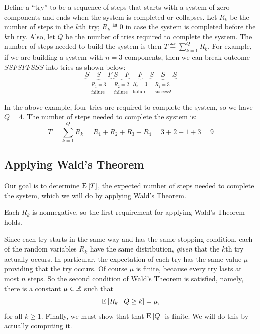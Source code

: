 \documentclass[11pt,twoside]{article}
\begin{document}
Define a ``try'' to be a sequence of steps that starts with a system
of zero components and ends when the system is completed or collapses.
Let $R_k$ be the number of steps in the $k$th try; $R_k \eqdef 0$ in case
the system is completed before the $k$th try.  Also, let $Q$ be the
number of tries required to complete the system.  The number of steps
needed to build the system is then $T \eqdef \sum_{k=1}^Q R_k$.  For
example, if we are building a system with $n = 3$ components, then we
can break outcome $SSFSFFSSS$ into tries as shown below:
\[
\underbrace{S \quad S \quad F}_{
        \begin{array}{c} R_1 = 3 \\ \text{failure} \end{array}}
\underbrace{S \quad F}_{
        \begin{array}{c} R_2 = 2 \\ \text{failure} \end{array}}
\underbrace{F}_{
        \begin{array}{c} R_3 = 1 \\ \text{failure} \end{array}}
\underbrace{S \quad S \quad S}_{
        \begin{array}{c} R_4 = 3 \\ \text{success!} \end{array}}
\]

In the above example, four tries are required to complete the system,
so we have $Q = 4$.  The number of steps needed to complete the system
is:
\[
T = \sum_{k=1}^Q R_k = R_1 + R_2 + R_3 + R_4 = 3 + 2 + 1 + 3 = 9
\]

\subsection{Applying Wald's Theorem}

Our goal is to determine $\mathop{\textup{E}}\nolimits\left[T\right]$, the expected number of steps needed
to complete the system, which we will do by applying Wald's Theorem.

Each $R_k$ is nonnegative, so the first requirement for applying Wald's
Theorem holds.

Since each try starts in the same way and has the same stopping condition,
each of the random variables $R_k$ have the same distribution,
\emph{given} that the $k$th try actually occurs.  In particular, the
expectation of each try has the same value $\mu$ providing that the try
occurs.  Of course $\mu$ is finite, because every try lasts at most $n$
steps.  So the second condition of Wald's Theorem is satisfied, namely,
there is a constant $\mu \in \mathbb{R}$ such that
\[
\mathop{\textup{E}}\nolimits\left[R_k\mid Q \geq k\right] = \mu,
\]
for all $k\geq 1$.  Finally, we must show that that $\mathop{\textup{E}}\nolimits\left[Q\right]$ is
finite.  We will do this by actually computing it.
\end{document}
